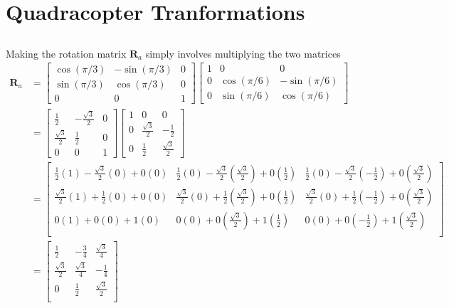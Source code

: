 \documentclass[]{article}
\begin{document}
\section{Quadracopter Tranformations}

\subsection{}

Making the rotation matrix \(\mathbf{R}_a\) simply involves multiplying the two matrices 
\begin{align}
	\mathbf{R}_a &= 
	\begin{bmatrix}
	\cos(\pi/3) & -\sin(\pi/3) & 0 \\
	\sin(\pi/3) & \cos(\pi/3) & 0 \\
	0 & 0 & 1
	\end{bmatrix}
	\begin{bmatrix}
	1 & 0 & 0 \\
	0 & \cos(\pi/6) & -\sin(\pi/6) \\
	0 & \sin(\pi/6) & \cos(\pi/6)
	\end{bmatrix} \\
	&= \begin{bmatrix}
	\frac{1}{2} & -\frac{\sqrt{3}}{2} & 0 \\
	\frac{\sqrt{3}}{2} & \frac{1}{2} & 0 \\
	0 & 0 & 1
	\end{bmatrix}
	\begin{bmatrix}
	1 & 0 & 0 \\
	0 & \frac{\sqrt{3}}{2} & -\frac{1}{2} \\
	0 & \frac{1}{2} & \frac{\sqrt{3}}{2}
	\end{bmatrix} \\
	&= 
	\begin{bmatrix}
	\frac{1}{2}(1) - \frac{\sqrt{3}}{2}(0) + 0(0) & \frac{1}{2}(0) - \frac{\sqrt{3}}{2}\left(\frac{\sqrt{3}}{2}\right) + 0\left(\frac{1}{2}\right) & \frac{1}{2}(0) - \frac{\sqrt{3}}{2}\left(-\frac{1}{2}\right) + 0\left(\frac{\sqrt{3}}{2}\right) \\
	\frac{\sqrt{3}}{2}(1) + \frac{1}{2}(0) + 0(0) & \frac{\sqrt{3}}{2}(0) + \frac{1}{2}\left(\frac{\sqrt{3}}{2}\right) + 0\left(\frac{1}{2}\right) & \frac{\sqrt{3}}{2}(0) + \frac{1}{2}\left(-\frac{1}{2}\right) + 0\left(\frac{\sqrt{3}}{2}\right) \\
	0(1) + 0(0) + 1(0) & 0(0) + 0\left(\frac{\sqrt{3}}{2}\right) + 1\left(\frac{1}{2}\right) & 0(0) + 0\left(-\frac{1}{2}\right) + 1\left(\frac{\sqrt{3}}{2}\right) \\
	\end{bmatrix} \\
	&= 
	\begin{bmatrix}
	\frac{1}{2} & -\frac{3}{4} & \frac{\sqrt{3}}{4} \\
	\frac{\sqrt{3}}{2} & \frac{\sqrt{3}}{4} & -\frac{1}{4} \\
	0 & \frac{1}{2} & \frac{\sqrt{3}}{2} \\
	\end{bmatrix}
\end{align}
\end{document}

